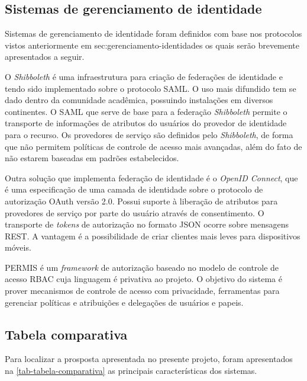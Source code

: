 \documentclass{doublecol-new}
\begin{document}
\subsection{Sistemas de gerenciamento de identidade}

Sistemas de gerenciamento de identidade foram definidos com base nos protocolos vistos anteriormente em sec:gerenciamento-identidades os quais serão brevemente apresentados a seguir. 

O \textit{Shibboleth} é uma infraestrutura para criação de federações de identidade e tendo sido implementado sobre o protocolo SAML. O uso mais difundido tem se dado dentro da comunidade acadêmica, possuindo instalações em diversos continentes. O SAML que serve de base para a federação \textit{Shibboleth} permite o transporte de informações de atributos do usuários do provedor de identidade para o recurso. Os provedores de serviço são definidos pelo \textit{Shibboleth}, de forma que não permitem políticas de controle de acesso mais avançadas, além do fato de não estarem baseadas em padrões estabelecidos.

Outra solução que implementa federação de identidade é o \textit{OpenID Connect}, que é uma especificação de uma camada de identidade sobre o protocolo de autorização OAuth versão 2.0. Possui suporte à liberação de atributos para provedores de serviço por parte do usuário através de consentimento. O transporte de \textit{tokens} de autorização no formato JSON ocorre sobre mensagens REST. A vantagem é a possibilidade de criar clientes mais leves para dispositivos móveis.

PERMIS \cite{chadwick2008permis} é um \textit{framework} de autorização baseado no modelo de controle de acesso RBAC cuja linguagem é privativa ao projeto. O objetivo do sistema é prover mecanismos de controle de acesso com privacidade, ferramentas para gerenciar políticas e atribuições e delegações de usuários e papeis.



\subsection{Tabela comparativa}

Para localizar a prosposta apresentada no presente projeto, foram apresentados na \ref{tab-tabela-comparativa} as principais características dos sistemas.
\end{document}
